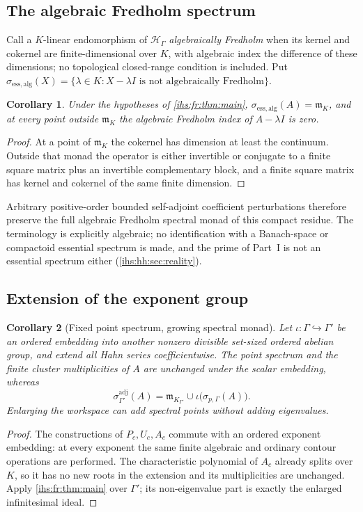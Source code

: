 \documentclass[11pt,a4paper]{article}
\numberwithin{equation}{section}
\newtheorem{corollary}[corollary]{Corollary}
\theoremstyle{definition}
\theoremstyle{remark}
\newcommand{\K}{K}
\newcommand{\mK}{\mathfrak m_K}
\newcommand{\Hil}{\mathcal H_\Gamma}
\begin{document}
\subsection{The algebraic Fredholm spectrum}\label{ihs:fr:sec:essential}
Call a $\K$-linear endomorphism of $\Hil$ \emph{algebraically Fredholm} when
its kernel and cokernel are finite-dimensional over $\K$, with algebraic
index the difference of these dimensions; no topological closed-range
condition is included. Put
$\sigma_{\mathrm{ess,alg}}(X)=\{\lambda\in\K:X-\lambda I\text{ is not
algebraically Fredholm}\}$.

\begin{corollary}\label{ihs:fr:cor:essential}
Under the hypotheses of \cref{ihs:fr:thm:main},
$\sigma_{\mathrm{ess,alg}}(A)=\mK$, and at every point outside $\mK$ the
algebraic Fredholm index of $A-\lambda I$ is zero.
\end{corollary}
\begin{proof}
At a point of $\mK$ the cokernel has dimension at least the continuum.
Outside that monad the operator is either invertible or conjugate to a
finite square matrix plus an invertible complementary block, and a finite
square matrix has kernel and cokernel of the same finite dimension.
\end{proof}

Arbitrary positive-order bounded self-adjoint coefficient perturbations
therefore preserve the full algebraic Fredholm spectral monad of this
compact residue. The terminology is explicitly algebraic; no identification
with a Banach-space or compactoid essential spectrum is made, and the prime
of Part~I is not an essential spectrum either (\cref{ihs:hh:sec:reality}).

\subsection{Extension of the exponent group}\label{ihs:fr:sec:extension}
\begin{corollary}[Fixed point spectrum, growing spectral monad]\label{ihs:fr:cor:extension}
Let $\iota:\Gamma\hookrightarrow\Gamma'$ be an ordered embedding into another
nonzero divisible set-sized ordered abelian group, and extend all Hahn series
coefficientwise. The point spectrum and the finite cluster multiplicities of
$A$ are unchanged under the scalar embedding, whereas
\begin{equation}\label{ihs:fr:eq:extension}
 \sigma^{\mathrm{adj}}_{\Gamma'}(A)=\mathfrak m_{K_{\Gamma'}}\cup
 \iota\bigl(\sigma_{p,\Gamma}(A)\bigr).
\end{equation}
Enlarging the workspace can add spectral points without adding eigenvalues.
\end{corollary}
\begin{proof}
The constructions of $P_c,U_c,A_c$ commute with an ordered exponent
embedding: at every exponent the same finite algebraic and ordinary contour
operations are performed. The characteristic polynomial of $A_c$ already
splits over $\K$, so it has no new roots in the extension and its
multiplicities are unchanged. Apply \cref{ihs:fr:thm:main} over $\Gamma'$;
its non-eigenvalue part is exactly the enlarged infinitesimal ideal.
\end{proof}
\end{document}
